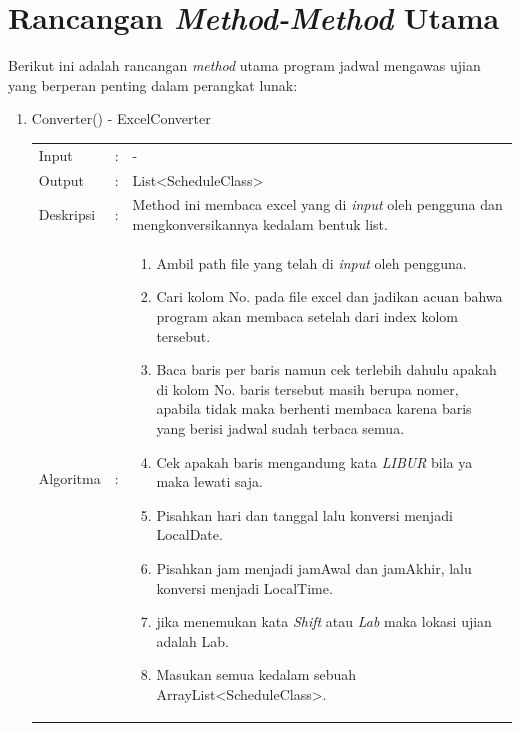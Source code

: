 \section{Rancangan \textit{Method-Method} Utama}
Berikut ini adalah rancangan \textit{method} utama program jadwal mengawas ujian yang berperan penting dalam perangkat lunak:
\begin{enumerate}
	\item Converter() - ExcelConverter\\
	\begin{tabular}{l c p{9cm}}
		Input & : & - \\ 
		Output & : & List<ScheduleClass>  \\ 
		Deskripsi & : & Method ini membaca excel yang di \textit{input} oleh pengguna dan mengkonversikannya kedalam bentuk list.\\
		Algoritma & : & \begin{enumerate}
			\item Ambil path file yang telah di \textit{input} oleh pengguna.
			\item Cari kolom No. pada file excel dan jadikan acuan bahwa program akan membaca setelah dari index kolom tersebut.
			\item Baca baris per baris namun cek terlebih dahulu apakah di kolom No. baris tersebut masih berupa nomer, apabila tidak maka berhenti membaca karena baris yang berisi jadwal sudah terbaca semua.
			\item Cek apakah baris mengandung kata \textit{LIBUR} bila ya maka lewati saja.
			\item Pisahkan hari dan tanggal lalu konversi menjadi LocalDate. 
			\item Pisahkan jam menjadi jamAwal dan jamAkhir, lalu konversi menjadi LocalTime.
			\item jika menemukan kata \textit{Shift} atau \textit{Lab} maka lokasi ujian adalah Lab.
			\item Masukan semua kedalam sebuah ArrayList<ScheduleClass>.
		\end{enumerate}
		\end{tabular}	
	

\end{enumerate}
